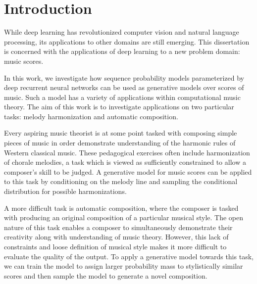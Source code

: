 \chapter{Introduction}





While deep learning has revolutionized computer vision and natural language
processing, its applications to other domains are still emerging. This
dissertation is concerned with the applications of deep learning to a new
problem domain: music scores.

In this work, we investigate how sequence probability models parameterized by
deep recurrent neural networks can be used as generative models over scores of
music. Such a model has a variety of applications within computational music
theory. The aim of this work is to investigate applications on two particular
tasks: melody harmonization and automatic composition.

Every aspiring music theorist is at some point tasked with composing simple
pieces of music in order demonstrate understanding of the harmonic rules of
Western classical music. These pedagogical exercises often include
harmonization of chorale melodies, a task which is viewed as sufficiently
constrained to allow a composer's skill to be judged. A generative model
for music scores can be applied to this task by conditioning on the melody
line and sampling the conditional distribution for possible harmonizations.

A more difficult task is automatic composition, where the composer is tasked
with producing an original composition of a particular musical style. The open
nature of this task enables a composer to simultaneously demonstrate their
creativity along with understanding of music theory. However, this lack of
constraints and loose definition of musical style makes it more difficult to
evaluate the quality of the output. To apply a generative model towards this
task, we can train the model to assign larger probability mass to stylistically
similar scores and then sample the model to generate a novel composition.

